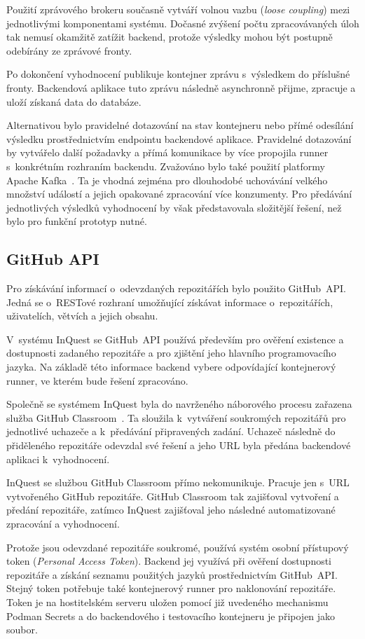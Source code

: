 \documentclass[
  biblatex,
  figures,
  tables,
  glossaries,
  index
]{kidiplom}
\begin{document}
Použití zprávového brokeru současně vytváří volnou vazbu (\textit{loose coupling}) mezi jednotlivými komponentami systému. Dočasné zvýšení počtu zpracovávaných úloh tak nemusí okamžitě zatížit backend, protože výsledky mohou být postupně odebírány ze zprávové fronty.~\cite{rabbitmq}

Po dokončení vyhodnocení publikuje kontejner zprávu s~výsledkem do příslušné fronty. Backendová aplikace tuto zprávu následně asynchronně přijme, zpracuje a uloží získaná data do databáze. 

Alternativou bylo pravidelné dotazování na stav kontejneru nebo přímé odesílání výsledku prostřednictvím endpointu backendové aplikace. Pravidelné dotazování by vytvářelo další požadavky a přímá komunikace by více propojila runner s~konkrétním rozhraním backendu. Zvažováno bylo také použití platformy Apache Kafka~\cite{kafka}. Ta je vhodná zejména pro dlouhodobé uchovávání velkého množství událostí a jejich opakované zpracování více konzumenty. Pro předávání jednotlivých výsledků vyhodnocení by však představovala složitější řešení, než bylo pro funkční prototyp nutné.

\subsection{GitHub API}
Pro získávání informací o~odevzdaných repozitářích bylo použito GitHub~API. Jedná se o~RESTové rozhraní umožňující získávat informace o~repozitářích, uživatelích, větvích a jejich obsahu.~\cite{gitapi}

V~systému InQuest se GitHub~API používá především pro ověření existence a dostupnosti zadaného repozitáře a pro zjištění jeho hlavního programovacího jazyka. Na základě této informace backend vybere odpovídající kontejnerový runner, ve kterém bude řešení zpracováno.

Společně se systémem InQuest byla do navrženého náborového procesu zařazena služba GitHub Classroom~\cite{githubclass}. Ta sloužila k~vytváření soukromých repozitářů pro jednotlivé uchazeče a k~předávání připravených zadání. Uchazeč následně do přiděleného repozitáře odevzdal své řešení a jeho URL byla předána backendové aplikaci k~vyhodnocení.

InQuest se službou GitHub Classroom přímo nekomunikuje. Pracuje jen s~URL vytvořeného GitHub repozitáře. GitHub Classroom tak zajišťoval vytvoření a předání repozitáře, zatímco InQuest zajišťoval jeho následné automatizované zpracování a vyhodnocení.

Protože jsou odevzdané repozitáře soukromé, používá systém osobní přístupový token (\textit{Personal Access Token}). Backend jej využívá při ověření dostupnosti repozitáře a získání seznamu použitých jazyků prostřednictvím GitHub~API. Stejný token potřebuje také kontejnerový runner pro naklonování repozitáře. Token je na hostitelském serveru uložen pomocí již uvedeného mechanismu Podman Secrets a do backendového i testovacího kontejneru je připojen jako soubor.
\end{document}
